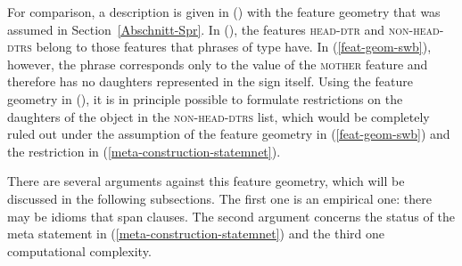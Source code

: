 \noindent
For comparison, a description is given in () with the feature geometry that was assumed in Section~\ref{Abschnitt-Spr}.
\ea
{}
\z
In (), the features \textsc{head-dtr} and \textsc{non-head-dtrs} belong to those features that phrases of type 
 have. In (\ref{feat-geom-swb}), however, the phrase corresponds only
to the value of the \textsc{mother} feature and therefore has no daughters represented in the sign itself.
Using the feature geometry in (), it is in principle possible to formulate restrictions on the daughters of the object
in the \textsc{non-head-dtrs} list, which would be completely ruled out under the assumption of the
feature geometry in (\ref{feat-geom-swb}) and the restriction in (\ref{meta-construction-statemnet}).

There are several arguments against this feature geometry, which will be discussed in the following
subsections. The first one is an empirical one: there may be idioms that span clauses. The second
argument concerns the status of the meta statement in (\ref{meta-construction-statemnet}) and the
third one computational complexity.

